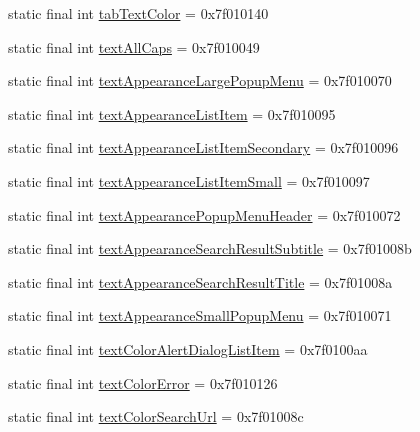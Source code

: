 \begin{CompactItemize}
\item 
static final int \hyperlink{classcom_1_1companyname_1_1x__2doo_1_1_r_1_1attr_19a3682daf015e5ae97ede6684865c2b}{tabTextColor} = 0x7f010140
\item 
static final int \hyperlink{classcom_1_1companyname_1_1x__2doo_1_1_r_1_1attr_440c890fd0d9d20178637dc0b7939341}{textAllCaps} = 0x7f010049
\item 
static final int \hyperlink{classcom_1_1companyname_1_1x__2doo_1_1_r_1_1attr_eb9c1b382bfb6774cca7ca009e4b8b12}{textAppearanceLargePopupMenu} = 0x7f010070
\item 
static final int \hyperlink{classcom_1_1companyname_1_1x__2doo_1_1_r_1_1attr_9a6f00adef5f9f8386a17232acf294af}{textAppearanceListItem} = 0x7f010095
\item 
static final int \hyperlink{classcom_1_1companyname_1_1x__2doo_1_1_r_1_1attr_a94d87aabbe8326b150f14b43dcc4e36}{textAppearanceListItemSecondary} = 0x7f010096
\item 
static final int \hyperlink{classcom_1_1companyname_1_1x__2doo_1_1_r_1_1attr_cf18b0d5b86e48b378387a4a26f282e4}{textAppearanceListItemSmall} = 0x7f010097
\item 
static final int \hyperlink{classcom_1_1companyname_1_1x__2doo_1_1_r_1_1attr_669258be6387f0b17dab897e56b622bb}{textAppearancePopupMenuHeader} = 0x7f010072
\item 
static final int \hyperlink{classcom_1_1companyname_1_1x__2doo_1_1_r_1_1attr_e83b534544c711b33a468c31d932cbba}{textAppearanceSearchResultSubtitle} = 0x7f01008b
\item 
static final int \hyperlink{classcom_1_1companyname_1_1x__2doo_1_1_r_1_1attr_653ca15316f25ee3eb81ee1122542ba0}{textAppearanceSearchResultTitle} = 0x7f01008a
\item 
static final int \hyperlink{classcom_1_1companyname_1_1x__2doo_1_1_r_1_1attr_f1663eed3dbdfc28b318623f565e4b0d}{textAppearanceSmallPopupMenu} = 0x7f010071
\item 
static final int \hyperlink{classcom_1_1companyname_1_1x__2doo_1_1_r_1_1attr_8a424228ee251472c1d91f95b08e3912}{textColorAlertDialogListItem} = 0x7f0100aa
\item 
static final int \hyperlink{classcom_1_1companyname_1_1x__2doo_1_1_r_1_1attr_f8178821179df9f3f3dddffaa768eb89}{textColorError} = 0x7f010126
\item 
static final int \hyperlink{classcom_1_1companyname_1_1x__2doo_1_1_r_1_1attr_30e023e27383c97ab825e2d25f715684}{textColorSearchUrl} = 0x7f01008c
\item 

\end{CompactItemize}
